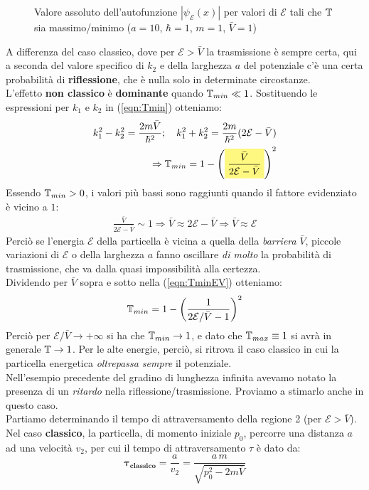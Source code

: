 \documentclass[../../FisicaTeorica.tex]{subfiles}
\begin{document}
\begin{figure}[H]
\centering

\caption{Valore assoluto dell'autofunzione $|\psi_{\mathcal{E}}(x)|$ per valori di $\mathcal{E}$ tali che $\mathbb{T}$ sia massimo/minimo ($a=10$, $\hbar=1$, $m=1$, $\bar{V}=1$)}
\label{plot:TEsuVmaxmin}
\end{figure}
A differenza del caso classico, dove per $\mathcal{E}>\bar{V}$ la trasmissione è sempre certa, qui a seconda del valore specifico di $k_2$ e della larghezza $a$ del potenziale c'è una certa probabilità di \textbf{riflessione}, che è nulla solo in determinate circostanze.\\
L'effetto \textbf{non classico} è \textbf{dominante} quando $\mathbb{T}_{min}\ll 1$. Sostituendo le espressioni per $k_1$ e $k_2$ in (\ref{eqn:Tmin}) otteniamo:
\begin{align}
k_1^2-k_2^2 = \frac{2m\bar{V}}{\hbar^2}; \quad k_1^2+k_2^2 = \frac{2m}{\hbar^2}(2\mathcal{E}-\bar{V})
\nonumber
\\
\Rightarrow \bb{T}_{min}= 1-\left(\hlc{Yellow}{\frac{\bar{V}}{2\mathcal{E}-\bar{V}}}\right)^2
\label{eqn:TminEV}
\end{align}
Essendo $\mathbb{T}_{min}>0$, i valori più bassi sono raggiunti quando il fattore evidenziato è vicino a $1$:
\begin{align*}
\frac{\bar{V}}{2\mathcal{E}-\bar{V}}\sim 1\Rightarrow \bar{V}\approx 2\mathcal{E}-\bar{V}\Rightarrow \bar{V}\approx \mathcal{E}
\end{align*}
Perciò se l'energia $\mathcal{E}$ della particella è vicina a quella della \textit{barriera} $\bar{V}$, piccole variazioni di $\mathcal{E}$ o della larghezza $a$ fanno oscillare \textit{di molto} la probabilità di trasmissione, che va dalla quasi impossibilità alla certezza.\\
Dividendo per $\bar{V}$ sopra e sotto nella (\ref{eqn:TminEV}) otteniamo:
\[
\mathbb{T}_{min} = 1-\left(\frac{1}{2\mathcal{E}/\bar{V}-1}\right)^2
\]
Perciò per $\mathcal{E}/\bar{V}\to +\infty$ si ha che $\mathbb{T}_{min}\to 1$, e dato che $\mathbb{T}_{max}\equiv 1$ si avrà in generale $\mathbb{T}\to 1$. Per le alte energie, perciò, si ritrova il caso classico in cui la particella energetica \textit{oltrepassa sempre} il potenziale.\\


Nell'esempio precedente del gradino di lunghezza infinita avevamo notato la presenza di un \textit{ritardo} nella riflessione/trasmissione. Proviamo a stimarlo anche in questo caso.\\
Partiamo determinando il tempo di attraversamento della regione 2 (per $\mathcal{E}>\bar{V}$). Nel caso \textbf{classico}, la particella, di momento iniziale $p_0$, percorre una distanza $a$ ad una velocità $v_2$, per cui il tempo di attraversamento $\tau$ è dato da:
\begin{equation}
\bm{\tau_{classico}}=\frac{a}{v_2}=\frac{a\,m}{\sqrt{p_0^2-2m\bar{V}}}
\label{eqn:ritardo_classico_rettangolare}
\end{equation}
 
\end{document}
